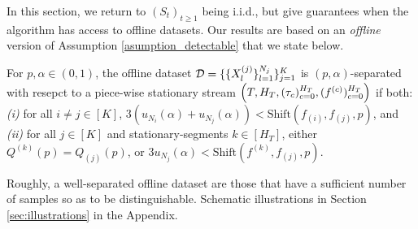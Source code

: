 
\label{sec:setting_3}


In this section, we return to $(S_t)_{t\geq 1}$ being i.i.d., but give guarantees when the algorithm has access to offline datasets. Our results are based on an \emph{offline} version of Assumption \ref{asumption_detectable} that we state below.




\begin{assumption}
For $p, \alpha \in (0,1)$, the offline dataset ${\mathcal{D}} = \{\{X_l^{(j)}\}_{l=1}^{N_j} \}_{j=1}^K$ is $(p, \alpha)$-separated  with resepct to a piece-wise stationary stream $\Bigl(T,H_T, (\tau_c)_{c=0}^{H_T}, (f^{(c)})_{c=0}^{H_T}\Bigr)$ if both: {\em (i)} for all $i \neq j \in [K]$, $3(u_{N_i}(\alpha) + u_{N_j}(\alpha)) < \text{Shift}(f_{(i)}, f_{(j)}, p)$, and {\em(ii)} for all $j \in [K]$ and stationary-segments $k \in [H_T]$, either $Q^{(k)}(p) = Q_{(j)}(p)$, or  $3u_{N_j}(\alpha) < \text{Shift}(f^{(k)}, f_{(j)},p)$.
\label{defn:offline_datasets}
\end{assumption}
{\color{black} Roughly, a well-separated offline dataset are those that have a sufficient number of samples so as to be distinguishable. Schematic illustrations in Section \ref{sec:illustrations} in the Appendix.} %

